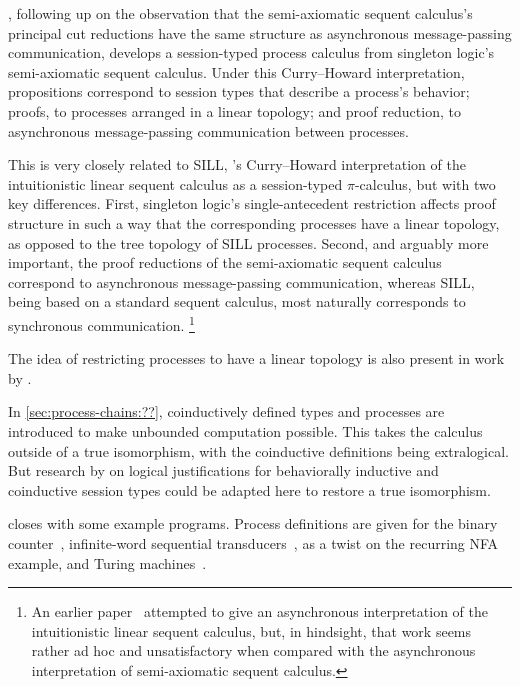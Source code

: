 , following up on the observation that the semi-axiomatic sequent calculus's principal cut reductions have the same structure as asynchronous message-passing communication, develops a session-typed process calculus from singleton logic's semi-axiomatic sequent calculus.
Under this Curry--Howard interpretation, propositions correspond to session types that describe a process's behavior; proofs, to processes arranged in a linear topology; and proof reduction, to asynchronous message-passing communication between processes.

This is very closely related to SILL, \citeauthor{Caires+:MSCS16}'s Curry--Howard interpretation of the intuitionistic linear sequent calculus as a session-typed $\pi$-calculus\autocites{Caires+Pfenning:CONCUR10}{Caires+:MSCS16}, but with two key differences.
First, singleton logic's single-antecedent restriction affects proof structure in such a way that the corresponding processes have a linear topology, as opposed to the tree topology of SILL processes.
Second, and arguably more important, the proof reductions of the semi-axiomatic sequent calculus correspond to asynchronous message-passing communication, whereas SILL, being based on a standard sequent calculus, most naturally corresponds to synchronous communication.%
\footnote{An earlier paper~\parencite{DeYoung+:CSL12} attempted to give an asynchronous interpretation of the intuitionistic linear sequent calculus, but, in hindsight, that work seems rather ad hoc and unsatisfactory when compared with the asynchronous interpretation of semi-axiomatic sequent calculus.}

The idea of restricting processes to have a linear topology is also present in work by \textcite{Dezani-Ciancaglini+:PLACES14}.

In \cref{sec:process-chains:??}, coinductively defined types and processes are introduced to make unbounded computation possible.
This takes the calculus outside of a true isomorphism, with the coinductive definitions being extralogical.
But research by \textcites{Derakhshan+Pfenning:LMCS20}{Somayyajula+Pfenning:20} on logical justifications for behaviorally inductive and coinductive session types could be adapted here to restore a true isomorphism.

 closes with some example programs.
Process definitions are given for the binary counter~, infinite-word sequential transducers~, as a twist on the recurring \acs*{NFA} example, and Turing machines~.


